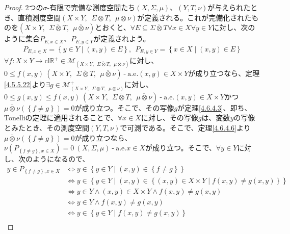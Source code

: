 \documentclass[dvipdfmx]{jsarticle}
\begin{document}
\begin{proof}
2つの$\sigma$-有限で完備な測度空間たち$(X,\varSigma,\mu)$、$(Y,T,\nu)$が与えられたとき、直積測度空間$(X \times Y,\ \ \varSigma \otimes T,\ \ \mu \otimes \nu)$が定義される。これが完備化されたものを$\left( X \times Y,\ \ \overline{\varSigma \otimes T},\ \ \overline{\mu \otimes \nu} \right)$とおくと、$\forall E \subseteq \overline{\varSigma \otimes T}\forall x \in X\forall y \in Y$に対し、次のように集合$P_{E,x \in X}$、$P_{E,y \in Y}$が定義されよう。
\begin{align*}
P_{E,x \in X} = \left\{ y \in Y \middle| (x,y) \in E \right\},\ \ P_{E,y \in Y} = \left\{ x \in X \middle| (x,y) \in E \right\}
\end{align*}
$\forall f:X \times Y \rightarrow \mathrm{cl}\mathbb{R}^{+} \in \mathcal{M}_{\left( X \times Y,\ \ \overline{\varSigma \otimes T},\ \ \overline{\mu \otimes \nu} \right)}$に対し、$0 \leq f(x,y)\ \left( X \times Y,\ \ \overline{\varSigma \otimes T},\ \ \overline{\mu \otimes \nu} \right) \ \text{-} \ \mathrm{a.e.}(x,y) \in X \times Y$が成り立つなら、定理\ref{4.5.5.22}より$\exists g \in \mathcal{M}_{(X \times Y,\ \ \varSigma \otimes T,\ \ \mu \otimes \nu)}^{+}$に対し、$0 \leq g(x,y) \leq f(x,y)\ \left( X \times Y,\ \ \overline{\varSigma \otimes T},\ \ \overline{\mu \otimes \nu} \right) \ \text{-} \ \mathrm{a.e.}(x,y) \in X \times Y$かつ$\overline{\mu \otimes \nu}\left( \left\{ f \neq g \right\} \right) = 0$が成り立つ。そこで、その写像$g$が定理\ref{4.6.4.3}、即ち、Tonelliの定理に適用されることで、$\forall x \in X$に対し、その写像$g$は、変数$y$の写像とみたとき、その測度空間$(Y,T,\nu)$で可測である。そこで、定理\ref{4.6.4.6}より$\overline{\mu \otimes \nu}\left( \left\{ f \neq g \right\} \right) = 0$が成り立つなら、$\nu\left( P_{\left\{ f \neq g \right\},x \in X} \right) = 0\ (X,\varSigma,\mu) \ \text{-} \ \mathrm{a.e.}x \in X$が成り立つ。そこで、$\forall y \in Y$に対し、次のようになるので、
\begin{align*}
y \in P_{\left\{ f \neq g \right\},x \in X} &\Leftrightarrow y \in \left\{ y \in Y \middle| (x,y) \in \left\{ f \neq g \right\} \right\}\\
&\Leftrightarrow y \in \left\{ y \in Y \middle| (x,y) \in \left\{ (x,y) \in X \times Y \middle| f(x,y) \neq g(x,y) \right\} \right\}\\
&\Leftrightarrow y \in Y \land (x,y) \in X \times Y \land f(x,y) \neq g(x,y)\\
&\Leftrightarrow y \in Y \land f(x,y) \neq g(x,y)\\
&\Leftrightarrow y \in \left\{ y \in Y \middle| f(x,y) \neq g(x,y) \right\}\\

\end{align*}
\end{proof}
\end{document}
